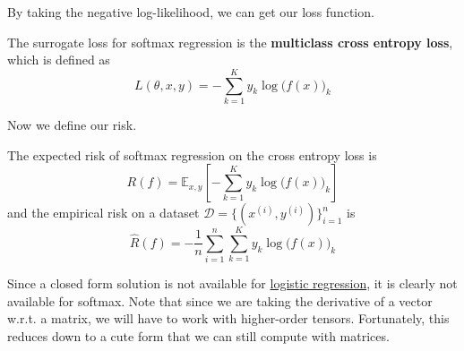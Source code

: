   By taking the negative log-likelihood, we can get our loss function. 

  \begin{definition}
    \label{def:multiclass-cross-entropy-loss-as-surrogate-loss}
    The surrogate loss for softmax regression is the \textbf{multiclass cross entropy loss}, which is defined as 
    \begin{equation}
      L(\theta, x, y) = - \sum_{k=1}^K y_k \log \big( f(x) \big)_k
    \end{equation}
  \end{definition}

  Now we define our risk. 

  \begin{theorem}[Risk]
    \label{thm:risk-2}
    The expected risk of softmax regression on the cross entropy loss is 
    \begin{equation}
      R(f) = \mathbb{E}_{x, y} \left[ - \sum_{k=1}^K y_k \log \big( f(x) \big)_k \right]
    \end{equation}
    and the empirical risk on a dataset $\mathcal{D} = \{(x^{(i)}, y^{(i)})\}_{i=1}^n$ is 
    \begin{equation}
      \hat{R}(f) = - \frac{1}{n} \sum_{i=1}^n \sum_{k=1}^K y_k \log \big( f(x) \big)_k
    \end{equation}
  \end{theorem}

  Since a closed form solution is not available for \hyperref[def:logistic-regression]{logistic regression}, it is clearly not available for softmax. Note that since we are taking the derivative of a vector w.r.t. a matrix, we will have to work with higher-order tensors. Fortunately, this reduces down to a cute form that we can still compute with matrices. 


